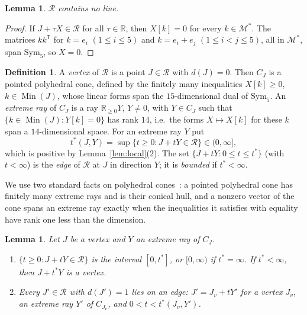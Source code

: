 \documentclass[11pt,reqno]{amsart}
\renewcommand{\_}{\origunderscore\allowbreak}
\numberwithin{equation}{section}
\theoremstyle{plain}
\newtheorem{lem}[thm]{Lemma}
\theoremstyle{definition}
\newtheorem{definition}[thm]{Definition}
\theoremstyle{remark}
\newcommand{\R}{\mathbb{R}}
\newcommand{\M}{\mathcal{M}}
\newcommand{\Rk}{\mathcal{R}}
\newcommand{\Sym}{\mathrm{Sym}}
\newcommand{\Min}{\operatorname{Min}}
\begin{document}
\begin{lem}\label{lem:nolines}
$\Rk$ contains no line.
\end{lem}

\begin{proof}
If $J+\tau X\in\Rk$ for all $\tau\in\R$, then $X[k]=0$ for every $k\in\M^*$. The matrices $kk^{\mathsf T}$ for $k=e_i$ $(1\le i\le5)$ and $k=e_i+e_j$ $(1\le i<j\le5)$, all in $\M^*$, span $\Sym_5$, so $X=0$.
\end{proof}

\begin{definition}
A \emph{vertex} of $\Rk$ is a point $J\in\Rk$ with $d(J)=0$. Then $C_J$ is a pointed polyhedral cone, defined by the finitely many inequalities $X[k]\ge0$, $k\in\Min(J)$, whose linear forms span the $15$-dimensional dual of $\Sym_5$. An \emph{extreme ray} of $C_J$ is a ray $\R_{\ge0}Y$, $Y\ne0$, with $Y\in C_J$ such that $\{k\in\Min(J):Y[k]=0\}$ has rank $14$, i.e.\ the forms $X\mapsto X[k]$ for these $k$ span a $14$-dimensional space. For an extreme ray $Y$ put
\[
t^*(J,Y)=\sup\{t\ge0:J+tY\in\Rk\}\in(0,\infty],
\]
which is positive by Lemma~\ref{lem:local}(2). The set $\{J+tY:0\le t\le t^*\}$ (with $t<\infty$) is the \emph{edge} of $\Rk$ at $J$ in direction $Y$; it is \emph{bounded} if $t^*<\infty$.
\end{definition}

We use two standard facts on polyhedral cones~\cite[Lecture~1]{Zie95}: a pointed polyhedral cone has finitely many extreme rays and is their conical hull, and a nonzero vector of the cone spans an extreme ray exactly when the inequalities it satisfies with equality have rank one less than the dimension.

\begin{lem}\label{lem:edges}
Let $J$ be a vertex and $Y$ an extreme ray of $C_J$.
\begin{enumerate}
\item $\{t\ge0:J+tY\in\Rk\}$ is the interval $[0,t^*]$, or $[0,\infty)$ if $t^*=\infty$. If $t^*<\infty$, then $J+t^*Y$ is a vertex.
\item Every $J'\in\Rk$ with $d(J')=1$ lies on an edge: $J'=J_v+tY'$ for a vertex $J_v$, an extreme ray $Y'$ of $C_{J_v}$, and $0<t<t^*(J_v,Y')$.
\end{enumerate}
\end{lem}
\end{document}
